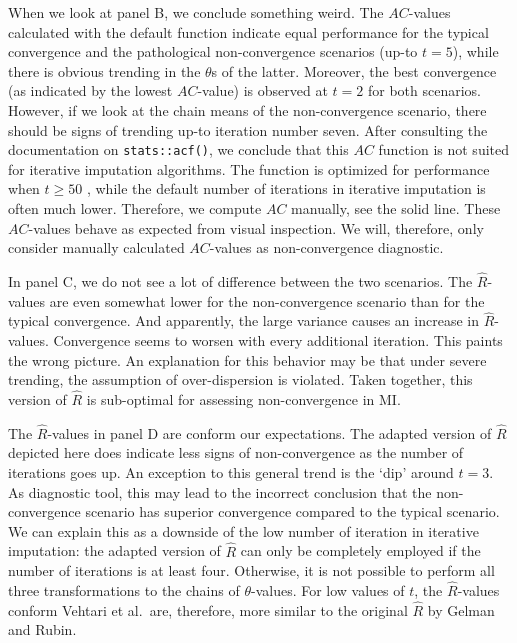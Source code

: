 \documentclass[Royal,times,sageh]{sagej}
\begin{document}
When we look at panel B, we conclude something weird. The \(AC\)-values calculated with the default function indicate equal performance for the typical convergence and the pathological non-convergence scenarios (up-to \(t=5\)), while there is obvious trending in the \(\theta\)s of the latter. Moreover, the best convergence (as indicated by the lowest \(AC\)-value) is observed at \(t=2\) for both scenarios. However, if we look at the chain means of the non-convergence scenario, there should be signs of trending up-to iteration number seven. After consulting the documentation on \texttt{stats::acf()}, we conclude that this \(AC\) function is not suited for iterative imputation algorithms. The function is optimized for performance when \(t\geq50\) \citep{box15}, while the default number of iterations in iterative imputation is often much lower. Therefore, we compute \(AC\) manually, see the solid line. These \(AC\)-values behave as expected from visual inspection. We will, therefore, only consider manually calculated \(AC\)-values as non-convergence diagnostic.

In panel C, we do not see a lot of difference between the two scenarios. The \(\widehat{R}\)-values are even somewhat lower for the non-convergence scenario than for the typical convergence. And apparently, the large variance causes an increase in \(\widehat{R}\)-values. Convergence seems to worsen with every additional iteration. This paints the wrong picture. An explanation for this behavior may be that under severe trending, the assumption of over-dispersion is violated. Taken together, this version of \(\widehat{R}\) is sub-optimal for assessing non-convergence in MI.

The \(\widehat{R}\)-values in panel D are conform our expectations. The adapted version of \(\widehat{R}\) depicted here does indicate less signs of non-convergence as the number of iterations goes up. An exception to this general trend is the `dip' around \(t=3\). As diagnostic tool, this may lead to the incorrect conclusion that the non-convergence scenario has superior convergence compared to the typical scenario. We can explain this as a downside of the low number of iteration in iterative imputation: the adapted version of \(\widehat{R}\) can only be completely employed if the number of iterations is at least four. Otherwise, it is not possible to perform all three transformations to the chains of \(\theta\)-values. For low values of \(t\), the \(\widehat{R}\)-values conform Vehtari et al.~are, therefore, more similar to the original \(\widehat{R}\) by Gelman and Rubin.
\end{document}
